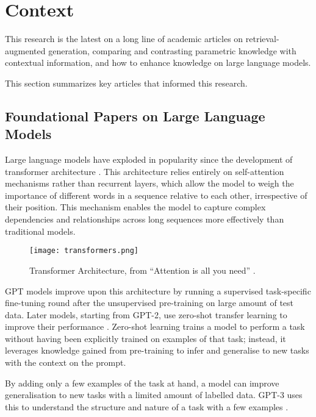 \section{Context}

This research is the latest on a long line of academic articles on retrieval-augmented generation, comparing and contrasting parametric knowledge with contextual information, and how to enhance knowledge on large language models.

This section summarizes key articles that informed this research.

\subsection{Foundational Papers on Large Language Models}

Large language models have exploded in popularity since the development of transformer architecture \citep{attention_is_all_you_need}.
This architecture relies entirely on self-attention mechanisms rather than recurrent layers, which allow the model to weigh the importance of different words in a sequence relative to each other, irrespective of their position.
This mechanism enables the model to capture complex dependencies and relationships across long sequences more effectively than traditional models.

\begin{figure}[htb]
	\centering
	\texttt{[image: transformers.png]}
	\caption{Transformer Architecture, from ``Attention is all you need'' \citep{attention_is_all_you_need}.}
\end{figure}

GPT models \citep{gpt} improve upon this architecture by running a supervised task-specific fine-tuning round after the unsupervised pre-training on large amount of test data.
Later models, starting from GPT-2, use zero-shot transfer learning to improve their performance \citep{gpt2}.
Zero-shot learning \citep{zeroshotlearning} trains a model to perform a task without having been explicitly trained on examples of that task; instead, it leverages knowledge gained from pre-training to infer and generalise to new tasks with the context on the prompt.

By adding only a few examples of the task at hand, a model can improve generalisation to new tasks with a limited amount of labelled data.
GPT-3 uses this to understand the structure and nature of a task with a few examples \citep{gpt3}.

